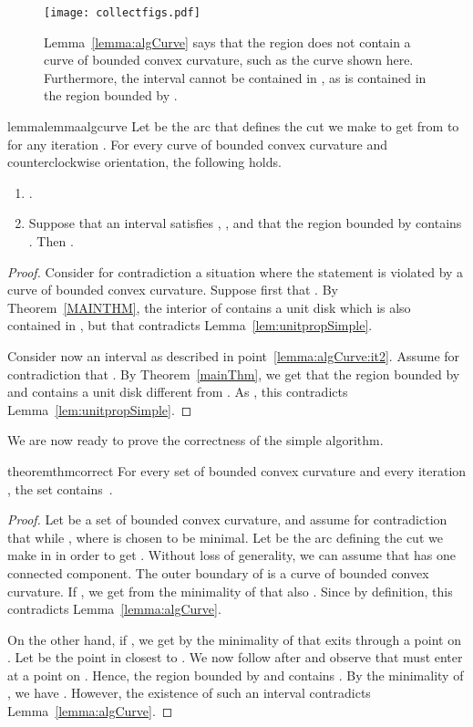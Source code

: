 \documentclass{article}
\begin{document}
\begin{figure}
\centering
\texttt{[image: collectfigs.pdf]}
\caption{Lemma~\ref{lemma:algCurve} says that the region  does not contain a curve of bounded convex curvature, such as the curve  shown here.
Furthermore, the interval  cannot be contained in , as  is contained in the region bounded by .}
\label{fig:lemma:algCurve}
\end{figure}

\begin{restatable}{lemma}{lemmaalgcurve}
\label{lemma:algCurve}
Let  be the arc that defines the cut we make to get from  to  for any iteration .
For every curve  of bounded convex curvature and counterclockwise orientation, the following holds.
\begin{enumerate}
\item
.

\item\label{lemma:algCurve:it2}
Suppose that an interval  satisfies , , and that the region bounded by  contains .
Then .
\end{enumerate}
\end{restatable}

\begin{proof}
Consider for contradiction
a situation where the statement is violated by a curve  of bounded convex curvature.
Suppose first that .
By Theorem~\ref{MAINTHM}, the interior of  contains a unit disk  which is also contained in , but that contradicts Lemma~\ref{lem:unitpropSimple}.

Consider now an interval  as described in point~\ref{lemma:algCurve:it2}.
Assume for contradiction that .
By Theorem~\ref{mainThm}, we get that the region  bounded by  and  contains a unit disk different from .
As , this contradicts Lemma~\ref{lem:unitpropSimple}.
\end{proof}

We are now ready to prove the correctness of the simple algorithm.

\begin{restatable}{theorem}{thmcorrect}
\label{algOptimalSimple}
For every set  of bounded convex curvature and every iteration , the set  contains~.
\end{restatable}

\begin{proof}
Let  be a set of bounded convex curvature, and assume for contradiction that  while , where  is chosen to be minimal.
Let  be the arc defining the cut we make in  in order to get .
Without loss of generality, we can assume that  has one connected component.
The outer boundary of  is a curve  of bounded convex curvature.
If , we get from the minimality of  that also .
Since  by definition, this contradicts Lemma~\ref{lemma:algCurve}.

On the other hand, if , we get by the minimality of  that  exits  through a point on .
Let  be the point in  closest to .
We now follow  after  and observe that  must enter  at a point  on .
Hence, the region  bounded by  and  contains .
By the minimality of , we have .
However, the existence of such an interval  contradicts Lemma~\ref{lemma:algCurve}.
\end{proof}
\end{document}

